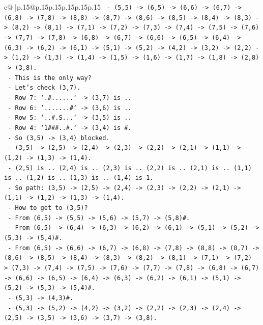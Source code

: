 \documentclass{article}
\begin{document}
{\begin{supertabular}{c@{$\;$}|p{.15\linewidth}@{}p{.15\linewidth}p{.15\linewidth}p{.15\linewidth}p{.15\linewidth}p{.15\linewidth}}
{{{\texttt{  {-} (5,5) {-}> (6,5) {-}> (6,6) {-}> (6,7) {-}> (6,8) {-}> (7,8) {-}> (8,8) {-}> (8,7) {-}> (8,6) {-}> (8,5) {-}> (8,4) {-}> (8,3) {-}> (8,2) {-}> (8,1) {-}> (7,1) {-}> (7,2) {-}> (7,3) {-}> (7,4) {-}> (7,5) {-}> (7,6) {-}> (7,7) {-}> (7,8) {-}> (6,8) {-}> (6,7) {-}> (6,6) {-}> (6,5) {-}> (6,4) {-}> (6,3) {-}> (6,2) {-}> (6,1) {-}> (5,1) {-}> (5,2) {-}> (4,2) {-}> (3,2) {-}> (2,2) {-}> (1,2) {-}> (1,3) {-}> (1,4) {-}> (1,5) {-}> (1,6) {-}> (1,7) {-}> (1,8) {-}> (2,8) {-}> (3,8).} \\
\texttt{  {-} This is the only way?} \\
\texttt{  {-} Let's check (3,7).} \\
\texttt{  {-} Row 7: `.\#......` {-}> (3,7) is ..} \\
\texttt{  {-} Row 6: `.......\#` {-}> (3,6) is ..} \\
\texttt{  {-} Row 5: `..\#.S...` {-}> (3,5) is ..} \\
\texttt{  {-} Row 4: `1\#\#\#..\#.` {-}> (3,4) is \#.} \\
\texttt{  {-} So (3,5) {-}> (3,4) blocked.} \\
\texttt{  {-} (3,5) {-}> (2,5) {-}> (2,4) {-}> (2,3) {-}> (2,2) {-}> (2,1) {-}> (1,1) {-}> (1,2) {-}> (1,3) {-}> (1,4).} \\
\texttt{  {-} (2,5) is .. (2,4) is .. (2,3) is .. (2,2) is .. (2,1) is .. (1,1) is .. (1,2) is .. (1,3) is .. (1,4) is 1.} \\
\texttt{  {-} So path: (3,5) {-}> (2,5) {-}> (2,4) {-}> (2,3) {-}> (2,2) {-}> (2,1) {-}> (1,1) {-}> (1,2) {-}> (1,3) {-}> (1,4).} \\
\texttt{  {-} How to get to (3,5)?} \\
\texttt{  {-} From (6,5) {-}> (5,5) {-}> (5,6) {-}> (5,7) {-}> (5,8)\#.} \\
\texttt{  {-} From (6,5) {-}> (6,4) {-}> (6,3) {-}> (6,2) {-}> (6,1) {-}> (5,1) {-}> (5,2) {-}> (5,3) {-}> (5,4)\#.} \\
\texttt{  {-} From (6,5) {-}> (6,6) {-}> (6,7) {-}> (6,8) {-}> (7,8) {-}> (8,8) {-}> (8,7) {-}> (8,6) {-}> (8,5) {-}> (8,4) {-}> (8,3) {-}> (8,2) {-}> (8,1) {-}> (7,1) {-}> (7,2) {-}> (7,3) {-}> (7,4) {-}> (7,5) {-}> (7,6) {-}> (7,7) {-}> (7,8) {-}> (6,8) {-}> (6,7) {-}> (6,6) {-}> (6,5) {-}> (6,4) {-}> (6,3) {-}> (6,2) {-}> (6,1) {-}> (5,1) {-}> (5,2) {-}> (5,3) {-}> (5,4)\#.} \\
\texttt{  {-} (5,3) {-}> (4,3)\#.} \\
\texttt{  {-} (5,3) {-}> (5,2) {-}> (4,2) {-}> (3,2) {-}> (2,2) {-}> (2,3) {-}> (2,4) {-}> (2,5) {-}> (3,5) {-}> (3,6) {-}> (3,7) {-}> (3,8).} \\
}}}
\end{supertabular}}
\end{document}

